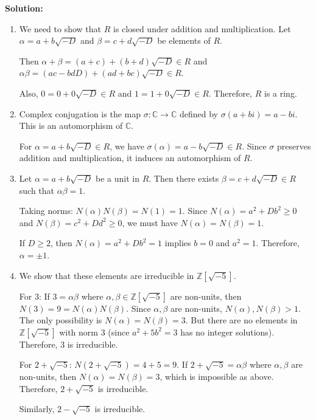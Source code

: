 \noindent\textbf{Solution:}
\begin{enumerate}[label=(\alph*)]
    \item We need to show that $R$ is closed under addition and multiplication. Let $\alpha = a + b\sqrt{-D}$ and $\beta = c + d\sqrt{-D}$ be elements of $R$.
    
    Then $\alpha + \beta = (a + c) + (b + d)\sqrt{-D} \in R$ and $\alpha\beta = (ac - bdD) + (ad + bc)\sqrt{-D} \in R$.
    
    Also, $0 = 0 + 0\sqrt{-D} \in R$ and $1 = 1 + 0\sqrt{-D} \in R$. Therefore, $R$ is a ring.
    
    \item Complex conjugation is the map $\sigma: \mathbb{C} \rightarrow \mathbb{C}$ defined by $\sigma(a + bi) = a - bi$. This is an automorphism of $\mathbb{C}$.
    
    For $\alpha = a + b\sqrt{-D} \in R$, we have $\sigma(\alpha) = a - b\sqrt{-D} \in R$. Since $\sigma$ preserves addition and multiplication, it induces an automorphism of $R$.
    
    \item Let $\alpha = a + b\sqrt{-D}$ be a unit in $R$. Then there exists $\beta = c + d\sqrt{-D} \in R$ such that $\alpha\beta = 1$.
    
    Taking norms: $N(\alpha)N(\beta) = N(1) = 1$. Since $N(\alpha) = a^2 + Db^2 \geq 0$ and $N(\beta) = c^2 + Dd^2 \geq 0$, we must have $N(\alpha) = N(\beta) = 1$.
    
    If $D \geq 2$, then $N(\alpha) = a^2 + Db^2 = 1$ implies $b = 0$ and $a^2 = 1$. Therefore, $\alpha = \pm 1$.
    
    \item We show that these elements are irreducible in $\mathbb{Z}[\sqrt{-5}]$.
    
    For 3: If $3 = \alpha\beta$ where $\alpha, \beta \in \mathbb{Z}[\sqrt{-5}]$ are non-units, then $N(3) = 9 = N(\alpha)N(\beta)$. Since $\alpha, \beta$ are non-units, $N(\alpha), N(\beta) > 1$. The only possibility is $N(\alpha) = N(\beta) = 3$. But there are no elements in $\mathbb{Z}[\sqrt{-5}]$ with norm 3 (since $a^2 + 5b^2 = 3$ has no integer solutions). Therefore, 3 is irreducible.
    
    For $2 + \sqrt{-5}$: $N(2 + \sqrt{-5}) = 4 + 5 = 9$. If $2 + \sqrt{-5} = \alpha\beta$ where $\alpha, \beta$ are non-units, then $N(\alpha) = N(\beta) = 3$, which is impossible as above. Therefore, $2 + \sqrt{-5}$ is irreducible.
    
    Similarly, $2 - \sqrt{-5}$ is irreducible.
\end{enumerate}


